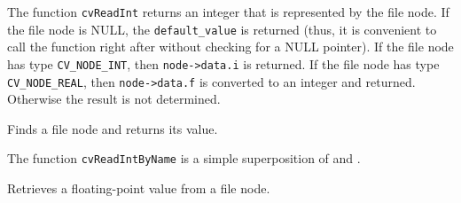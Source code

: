 \begin{description}
\end{description}


The function \texttt{cvReadInt} returns an integer that is represented
by the file node. If the file node is NULL, the \texttt{default\_value}
is returned (thus, it is convenient to call the function right after
 without checking for a NULL pointer). If
the file node has type \texttt{CV\_NODE\_INT}, then \texttt{node->data.i} is
returned. If the file node has type \texttt{CV\_NODE\_REAL},
then \texttt{node->data.f} is converted to an integer and returned. Otherwise the
result is not determined.

\label{ReadIntByName}

Finds a file node and returns its value.


\begin{description}
\end{description}

The function \texttt{cvReadIntByName} is a simple superposition of  and .


\label{ReadReal}

Retrieves a floating-point value from a file node.


\begin{description}
\end{description}


